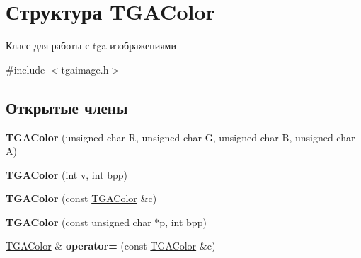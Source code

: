 \hypertarget{structTGAColor}{}\section{Структура T\+G\+A\+Color}
\label{structTGAColor}


Класс для работы с tga изображениями  




{\ttfamily \#include $<$tgaimage.\+h$>$}

\subsection*{Открытые члены}
\begin{DoxyCompactItemize}
\item 
\mbox{\label{structTGAColor_ade60d5636ac3d1a1b1b10768b1f9d4a4}} 
{\bfseries T\+G\+A\+Color} (unsigned char R, unsigned char G, unsigned char B, unsigned char A)
\item 
\mbox{\label{structTGAColor_af93df3ecea1ed0a30ff66d9f14b63e20}} 
{\bfseries T\+G\+A\+Color} (int v, int bpp)
\item 
\mbox{\label{structTGAColor_a8240ba44f97572d0c8b6d869e3e92574}} 
{\bfseries T\+G\+A\+Color} (const \hyperlink{structTGAColor}{T\+G\+A\+Color} \&c)
\item 
\mbox{\label{structTGAColor_aebc6cb148afe5355b8a801ce5bb79c60}} 
{\bfseries T\+G\+A\+Color} (const unsigned char $\ast$p, int bpp)
\item 
\mbox{\label{structTGAColor_a0c10d08062bbdca47a7e3ba717df44d9}} 
\hyperlink{structTGAColor}{T\+G\+A\+Color} \& {\bfseries operator=} (const \hyperlink{structTGAColor}{T\+G\+A\+Color} \&c)
\end{DoxyCompactItemize}
